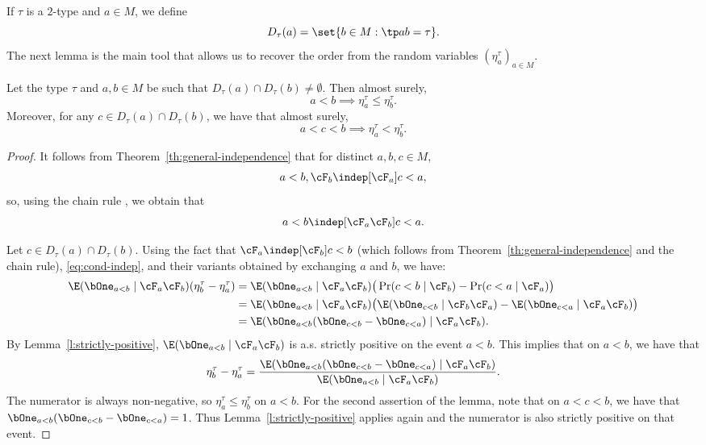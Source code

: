 If $\tau$ is a $2$-type and $a \in M$, we define
\begin{equation*}
D_\tau(a) = \set{b \in M : \tp ab = \tau}.
\end{equation*}
The next lemma is the main tool that allows us to recover the order from the random variables $(\eta^\tau_a)_{a \in M}$.
\begin{lemma}
\label{Lem:Inters}
Let the type $\tau$ and $a, b \in M$ be such that $D_\tau(a) \cap D_\tau(b) \neq \emptyset$. Then almost surely,
\begin{equation*}
a<b \implies \eta_a^\tau \leq \eta_b^\tau.
\end{equation*}
Moreover, for any $c \in D_\tau(a) \cap D_\tau(b)$, we have that almost surely,
\begin{equation*}
a < c < b \implies \eta^\tau_a < \eta^\tau_b.
\end{equation*}
\end{lemma}
\begin{proof}
It follows from Theorem~\ref{th:general-independence} that for distinct $a, b, c \in M$,
\begin{equation*}
a < b, \cF_b \indep[\cF_a] c < a,
\end{equation*}
so, using the chain rule \cite[Prop.\,5.8]{Kallenberg2002}, we obtain that
\begin{equation}
\label{eq:cond-indep}
a < b \indep[\cF_a \cF_b] c < a.
\end{equation}

Let $c \in D_\tau(a) \cap D_\tau(b)$. Using the fact that $\cF_a \indep[\cF_b] c < b$ (which follows from Theorem~\ref{th:general-independence} and the chain rule), \eqref{eq:cond-indep}, and their variants obtained by exchanging $a$ and $b$, we have:
\begin{equation*}
\begin{split}
\E(\bOne_{a < b} \mid \cF_a \cF_b) ( \eta^\tau_b - \eta^\tau_a ) &= \E(\bOne_{a < b} \mid \cF_a \cF_b) \big(\Pr(c < b \mid \cF_b) - \Pr(c < a \mid \cF_a) \big) \\
&= \E(\bOne_{a < b} \mid \cF_a \cF_b) \big(\E(\bOne_{c < b} \mid \cF_b \cF_a) - \E(\bOne_{c < a} \mid \cF_a \cF_b) \big) \\
&= \E(\bOne_{a < b}(\bOne_{c < b} - \bOne_{c < a}) \mid \cF_a \cF_b ).
\end{split}
\end{equation*}
By Lemma~\ref{l:strictly-positive}, $\E(\bOne_{a < b} \mid \cF_a \cF_b)$ is a.s. strictly positive on the event $a < b$. This implies that on $a < b$, we have that
\begin{equation*}
\eta^\tau_b - \eta^\tau_a = \frac{\E(\bOne_{a < b}(\bOne_{c < b} - \bOne_{c < a}) \mid \cF_a \cF_b )}{\E(\bOne_{a < b} \mid \cF_a \cF_b)}.
\end{equation*}
The numerator is always non-negative, so $\eta^\tau_a \leq \eta^\tau_b$ on $a < b$. For the second assertion of the lemma, note that on $a < c < b$, we have that $\bOne_{a < b}(\bOne_{c < b} - \bOne_{c < a}) = 1$. Thus Lemma~\ref{l:strictly-positive} applies again and the numerator is also strictly positive on that event.
\end{proof}

